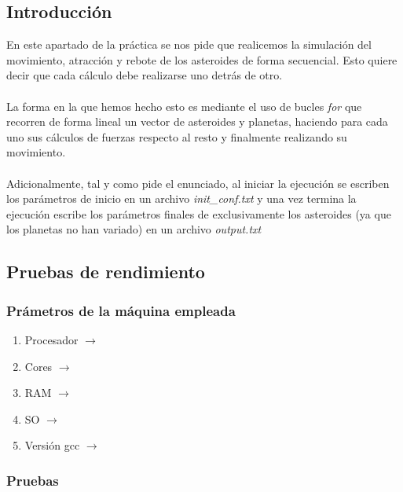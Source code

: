 \documentclass[12pt]{article}
\begin{document}
        \subsection{Introducción}
        \noindent En este apartado de la práctica se nos pide que realicemos la simulación del movimiento, atracción y rebote de los asteroides de forma secuencial. Esto quiere decir que cada cálculo debe realizarse uno detrás de otro. \\ \\
        La forma en la que hemos hecho esto es mediante el uso de bucles \textit{for} que recorren de forma lineal un vector de asteroides y planetas, haciendo para cada uno sus cálculos de fuerzas respecto al resto y finalmente realizando su movimiento.\\ \\
        Adicionalmente, tal y como pide el enunciado, al iniciar la ejecución se escriben los parámetros de inicio en un archivo \textit{init\_conf.txt} y una vez termina la ejecución escribe los parámetros finales de exclusivamente los asteroides (ya que los planetas no han variado) en un archivo \textit{output.txt}
        \noindent 
        \subsection{Pruebas de rendimiento}
        \subsubsection{Prámetros de la máquina empleada}
            \begin{enumerate}
                \item Procesador $\rightarrow$ 
                \item Cores $\rightarrow$ 
                \item RAM $\rightarrow$ 
                \item SO $\rightarrow$ 
                \item Versión gcc $\rightarrow$ 
            \end{enumerate}
        \subsubsection{Pruebas}
        
        
\end{document}
